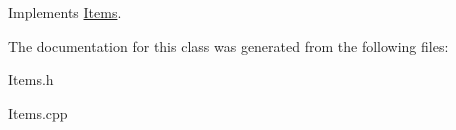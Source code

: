 Implements \hyperlink{classItems}{Items}.

The documentation for this class was generated from the following files:\begin{DoxyCompactItemize}
\item 
Items.h\item 
Items.cpp\end{DoxyCompactItemize}
